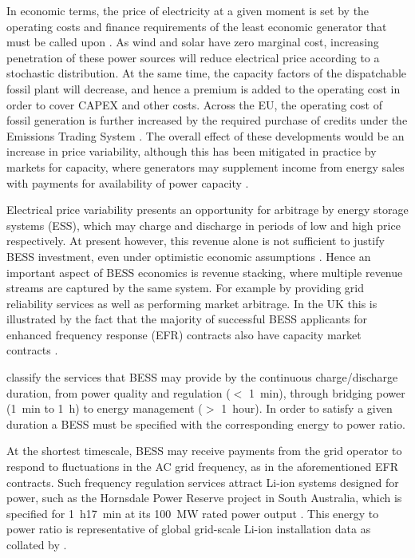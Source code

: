 \documentclass[preprint,3p,review,authoryear,10pt]{elsarticle}
\begin{document}
In economic terms, the price of electricity at a given moment is set by the operating costs and finance requirements of the least economic generator that must be called upon \cite{Staffell2016}. As wind and solar have zero marginal cost, increasing penetration of these power sources will reduce electrical price according to a stochastic distribution. At the same time, the capacity factors of the dispatchable fossil plant will decrease, and hence a premium is added to the operating cost in order to cover CAPEX and other costs. Across the EU, the operating cost of fossil generation is further increased by the required purchase of credits under the Emissions Trading System \cite{Staffell2018}. The overall effect of these developments would be an increase in price variability, although this has been mitigated in practice by markets for capacity, where generators may supplement income from energy sales with payments for availability of power capacity \cite{ENGIE}.

Electrical price variability presents an opportunity for arbitrage by energy storage systems (ESS), which may charge and discharge in periods of low and high price respectively. At present however, this revenue alone is not sufficient to justify BESS investment, even under optimistic economic assumptions \cite{Hu2010}. Hence an important aspect of BESS economics is revenue stacking, where multiple revenue streams are captured by the same system. For example by providing grid reliability services as well as performing market arbitrage. In the UK this is illustrated by the fact that the majority of successful BESS applicants for enhanced frequency response (EFR) contracts also have capacity market contracts \cite{NGDeratingFactors}.

\cite{Sabihuddin2015} classify the services that BESS may provide by the continuous charge/discharge duration, from power quality and regulation ($<$ \SI{1}{\minute}), through bridging power (\SI{1}{\minute} to \SI{1}{\hour}) to energy management ($>$ \SI{1}{hour}). In order to satisfy a given duration a BESS must be specified with the corresponding energy to power ratio.

At the shortest timescale, BESS may receive payments from the grid operator to respond to fluctuations in the AC grid frequency, as in the aforementioned EFR contracts. Such frequency regulation services attract Li-ion systems designed for power, such as the Hornsdale Power Reserve project in South Australia, which is specified for \SI{1}{\hour}\SI{17}{\minute} at its \SI{100}{\mega\watt} rated power output \cite{DOEGlobalESSDatabase}. This energy to power ratio is representative of global grid-scale Li-ion installation data as collated by \cite{Newbery2018}.
\end{document}
